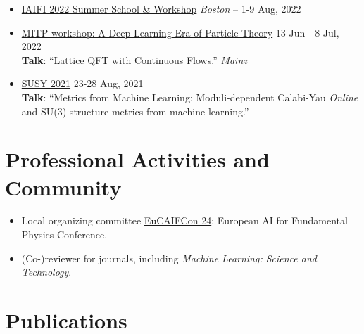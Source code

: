 \documentclass[11pt, letterpaper]{article}
\newcommand{\dateright}[1]{\hfill{\small\color{accentblue} #1}}
\begin{document}
\begin{itemize}[resume, itemsep=5pt]
    \item {\href{https://iaifi.org/past-workshops.html}{IAIFI 2022 Summer School \& Workshop}} \dateright{{\color{black}\textit{Boston} --} 1-9 Aug, 2022}

    \item {\href{https://indico.mitp.uni-mainz.de/event/254/overview}{MITP workshop: A Deep-Learning Era of Particle Theory}} \dateright{ 13 Jun - 8 Jul, 2022} \\
    {\footnotesize \textbf{Talk}: “Lattice QFT with Continuous Flows.”} \dateright{{\color{black}\textit{Mainz}}}

    \item {\href{https://indico.cern.ch/event/875077/contributions/4481976/}{SUSY 2021}} \dateright{ 23-28 Aug, 2021} \\
    {\footnotesize \textbf{Talk}: “Metrics from Machine Learning: Moduli-dependent Calabi-Yau} \dateright{{\color{black}\textit{Online}}}\\
    {\footnotesize and SU(3)-structure metrics from machine learning.”}


\end{itemize}


\section*{Professional Activities and Community}
\begin{itemize}[left=0pt, itemsep=3pt]
    \item Local organizing committee \href{https://www.aanmelder.nl/eucaifcon24}{EuCAIFCon 24}: European AI for Fundamental Physics Conference.
    \item (Co-)reviewer for journals, including \textit{Machine Learning: Science and Technology}.
\end{itemize}

\section*{Publications}
\end{document}
